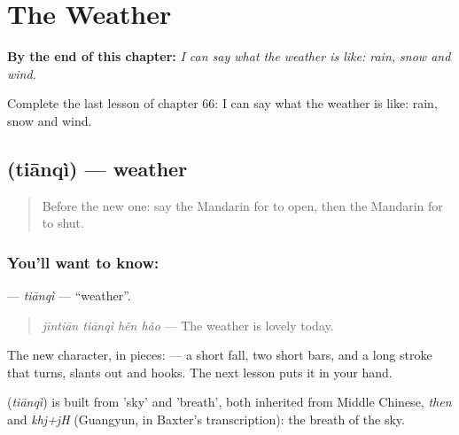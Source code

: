 
\chapter{The Weather}
\label{ch:zh-the-weather}

\begin{chapteropening}
\textbf{By the end of this chapter:} \emph{I can say what the weather is like: rain, snow and wind.}

Complete the last lesson of chapter 66: I can say what the weather is like: rain, snow and wind.
\end{chapteropening}

\section[\texorpdfstring{\zh{天气} (tiānqì)}{天气 (tiānqì)}]{ (tiānqì) — weather}

\label{lesson:ZH-C66-tianqi}



\begin{quote}
Before the new one: say the Mandarin for to open, then the Mandarin for to shut.
\end{quote}

\subsection*{You'll want to know: }
\textbf{} — \emph{tiānqì} — \textquotedblleft{}weather\textquotedblright{}.

\begin{quote}
\textbf{} \emph{jīntiān tiānqì hěn hǎo} — The weather is lovely today.
\end{quote}

The new character, in pieces:  — a short fall, two short bars, and a long stroke that turns, slants out and hooks. The next lesson puts it in your hand.

\begin{cousinweb}
\textbf{} (\emph{tiānqì}) is built from  'sky' and  'breath', both inherited from Middle Chinese, \emph{then} and \emph{khj+jH} (Guangyun, in Baxter's transcription): the breath of the sky.
\end{cousinweb}

